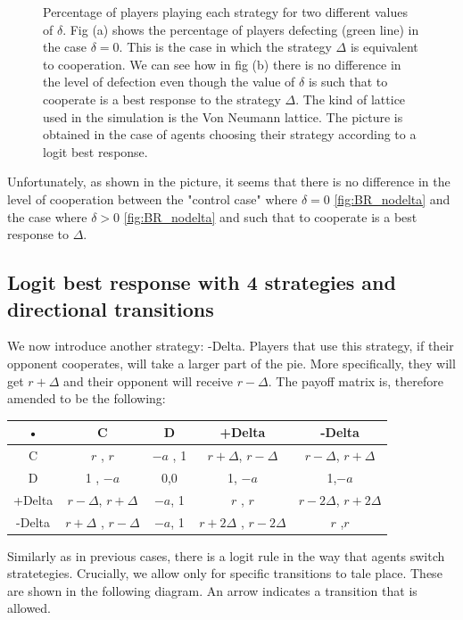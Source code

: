\documentclass{article}
\begin{document}
\begin{figure}[htbp]
\begin{subfigure}[t]{0.47\textwidth}
  \label{fig:BR_delta} 
\end{subfigure}
\caption{Percentage of players playing each strategy for two different values of $\delta$.
Fig (a) shows the percentage of players defecting (green line) in the case $\delta =0$. This is the case in which the strategy $\Delta$ is equivalent to cooperation.
We can see how in fig (b) there is no difference in the level of defection even though the value of $\delta$ is such that to cooperate is a best response to the strategy $\Delta$.
The kind of lattice used in the simulation is the Von Neumann lattice.
The picture is obtained in the case of agents choosing their strategy according to a logit best response.
}
\label{fig:BR}
\end{figure} 

Unfortunately, as shown in the picture, it seems that there is no difference in the level of cooperation between the "control case" where $\delta=0$ \ref{fig:BR_nodelta} and the case where $\delta>0$  \ref{fig:BR_nodelta} and such that to cooperate is a best response to $\Delta$.


\subsection{Logit best response with 4 strategies and directional transitions}
We now introduce another strategy: -Delta. Players that use this strategy, if their opponent cooperates, will take a larger part of the pie. More specifically, they will get $r+\Delta$ and their opponent will receive $r-\Delta$. The payoff matrix is, therefore amended to be the following:
\begin{center}
\begin{tabular}{|c|c|c|c|c|}
\hline 
• & C & D &+Delta & -Delta  \\ 
\hline 
C & $r$ , $r$ & $-a$ , 1 & $r+\Delta$, $r-\Delta$ & $r-\Delta$, $r+\Delta$ \\ 
\hline 
D & 1 , $-a$ & 0,0 & 1, $-a$ & 1,$-a$\\ 
\hline 
+Delta & $r -\Delta$, $r+\Delta$ & $-a$, 1 & $r$ , $r$& $r-2\Delta$, $r+2\Delta$ \\ 
\hline 
-Delta & $r+\Delta$ , $r-\Delta$ & $-a$, 1 & $r+2\Delta$ , $r-2\Delta$ & $r$ ,$ r$\\ 
\hline 
\end{tabular} 
\end{center}

Similarly as in previous cases, there is a logit rule in the way that agents switch stratetegies. Crucially, we allow only for specific transitions to tale place. These are shown in the following diagram. An arrow indicates a transition that is allowed. 
\end{document}
